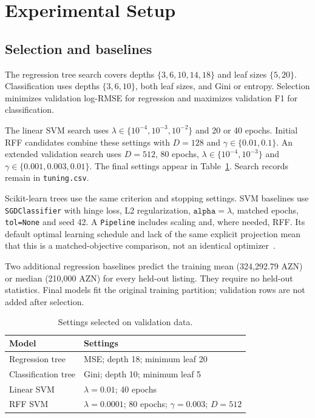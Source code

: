 \documentclass[10pt,twocolumn,a4paper]{article}
\begin{document}
\section{Experimental Setup}
\subsection{Selection and baselines}
The regression tree search covers depths $\{3,6,10,14,18\}$ and leaf sizes $\{5,20\}$. Classification uses depths $\{3,6,10\}$, both leaf sizes, and Gini or entropy. Selection minimizes validation log-RMSE for regression and maximizes validation F1 for classification.

The linear SVM search uses $\lambda\in\{10^{-4},10^{-3},10^{-2}\}$ and 20 or 40 epochs. Initial RFF candidates combine these settings with $D=128$ and $\gamma\in\{0.01,0.1\}$. An extended validation search uses $D=512$, 80 epochs, $\lambda\in\{10^{-4},10^{-3}\}$ and $\gamma\in\{0.001,0.003,0.01\}$. The final settings appear in Table~\ref{tab:config}. Search records remain in \texttt{tuning.csv}.

Scikit-learn trees use the same criterion and stopping settings. SVM baselines use \texttt{SGDClassifier} with hinge loss, L2 regularization, $\texttt{alpha}=\lambda$, matched epochs, \texttt{tol=None} and seed 42. A \texttt{Pipeline} includes scaling and, where needed, RFF. Its default optimal learning schedule and lack of the same explicit projection mean that this is a matched-objective comparison, not an identical optimizer~\cite{sgd}.

Two additional regression baselines predict the training mean (324,292.79 AZN) or median (210,000 AZN) for every held-out listing. They require no held-out statistics. Final models fit the original training partition; validation rows are not added after selection.

\begin{table}[t]\centering\small
\caption{Settings selected on validation data.}\label{tab:config}
\begin{tabular}{@{}lp{4.6cm}@{}}\toprule
Model & Settings\\\midrule
Regression tree & MSE; depth 18; minimum leaf 20\\
Classification tree & Gini; depth 10; minimum leaf 5\\
Linear SVM & $\lambda=0.01$; 40 epochs\\
RFF SVM & $\lambda=0.0001$; 80 epochs; $\gamma=0.003$; $D=512$\\\bottomrule
\end{tabular}
\end{table}
\end{document}
